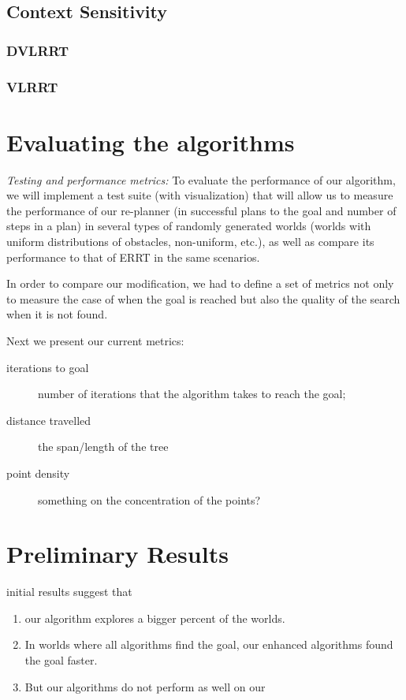 \documentclass[10pt,twoside,twocolumn]{article}
\begin{document}
\subsection{Context Sensitivity}

\subsubsection{DVLRRT}

\subsubsection{VLRRT}

\section{Evaluating the algorithms}

{\it Testing and performance metrics:} To evaluate the performance of our algorithm, we will implement a test suite (with visualization) that will allow us to measure the performance of our re-planner (in successful plans to the goal and number of steps in a plan) in several types of randomly generated worlds (worlds with uniform distributions of obstacles, non-uniform, etc.), as well as compare its performance to that of ERRT in the same
scenarios.

In order to compare our modification, we had to define a set of metrics not only to measure the case of when the goal is reached but also the quality of the search when it is not found.

Next we present our current metrics:
\begin{description}
\item[iterations to goal] number of iterations that the algorithm takes to reach the goal;
\item[distance travelled] the span/length of the tree
\item[point density] something on the concentration of the points?
\end{description}

\section{Preliminary Results}
initial results suggest that
\begin{enumerate}
\item our algorithm explores a bigger percent of the worlds.
\item In worlds where all algorithms find the goal, our enhanced algorithms found the goal faster.
\item But our algorithms do not perform as well on our
\end{enumerate}
\end{document}

